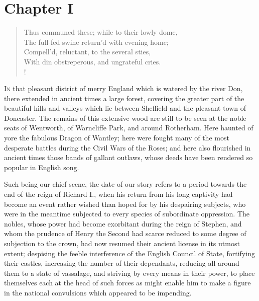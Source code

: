 \chapter{Chapter I}

\begin{verse}
Thus communed these; while to their lowly dome,\\
The full-fed swine return'd with evening home;\\
Compell'd, reluctant, to the several sties,\\
With din obstreperous, and ungrateful cries.\\!
\end{verse}

\lettrine{I}{n} that pleasant district of merry England which is watered
by the river
Don, there extended in ancient times a large forest, covering the
greater part of the beautiful hills and valleys which lie between
Sheffield and the pleasant town of Doncaster. The remains of this
extensive wood are still to be seen at the noble seats of Wentworth, of
Warncliffe Park, and around Rotherham. Here haunted of yore the fabulous
Dragon of Wantley; here were fought many of the most desperate battles
during the Civil Wars of the Roses; and here also flourished in ancient
times those bands of gallant outlaws, whose deeds have been rendered so
popular in English song.

Such being our chief scene, the date of our story refers to a period
towards the end of the reign of Richard I., when his return from his
long captivity had become an event rather wished than hoped for by his
despairing subjects, who were in the meantime subjected to every species
of subordinate oppression. The nobles, whose power had become exorbitant
during the reign of Stephen, and whom the prudence of Henry the Second
had scarce reduced to some degree of subjection to the crown, had now
resumed their ancient license in its utmost extent; despising the feeble
interference of the English Council of State, fortifying their castles,
increasing the number of their dependants, reducing all around them to a
state of vassalage, and striving by every means in their power, to place
themselves each at the head of such forces as might enable him to make a
figure in the national convulsions which appeared to be impending.

